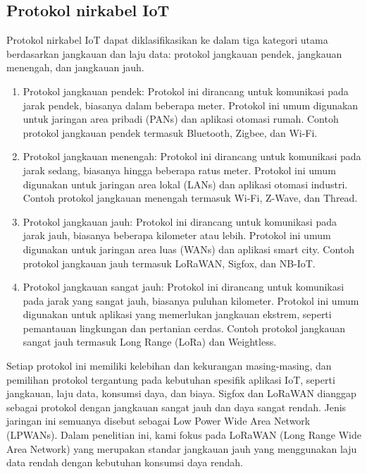 \subsection{Protokol nirkabel IoT}
Protokol nirkabel IoT dapat diklasifikasikan ke dalam tiga kategori utama berdasarkan jangkauan dan laju data: protokol jangkauan pendek, jangkauan menengah, dan jangkauan jauh.
\begin{enumerate}
    \item Protokol jangkauan pendek: Protokol ini dirancang untuk komunikasi pada jarak pendek, biasanya dalam beberapa meter. Protokol ini umum digunakan untuk jaringan area pribadi (PANs) dan aplikasi otomasi rumah. Contoh protokol jangkauan pendek termasuk Bluetooth, Zigbee, dan Wi-Fi.
    \item   Protokol jangkauan menengah: Protokol ini dirancang untuk komunikasi pada jarak sedang, biasanya hingga beberapa ratus meter. Protokol ini umum digunakan untuk jaringan area lokal (LANs) dan aplikasi otomasi industri. Contoh protokol jangkauan menengah termasuk Wi-Fi, Z-Wave, dan Thread.
    \item Protokol jangkauan jauh: Protokol ini dirancang untuk komunikasi pada jarak jauh, biasanya beberapa kilometer atau lebih. Protokol ini umum digunakan untuk jaringan area luas (WANs) dan aplikasi smart city. Contoh protokol jangkauan jauh termasuk LoRaWAN, Sigfox, dan NB-IoT.
    \item Protokol jangkauan sangat jauh: Protokol ini dirancang untuk komunikasi pada jarak yang sangat jauh, biasanya puluhan kilometer. Protokol ini umum digunakan untuk aplikasi yang memerlukan jangkauan ekstrem, seperti pemantauan lingkungan dan pertanian cerdas. Contoh protokol jangkauan sangat jauh termasuk Long Range (LoRa) dan Weightless.
\end{enumerate}


Setiap protokol ini memiliki kelebihan dan kekurangan masing-masing, dan pemilihan protokol tergantung pada kebutuhan spesifik aplikasi IoT, seperti jangkauan, laju data, konsumsi daya, dan biaya.
Sigfox dan LoRaWAN dianggap sebagai protokol dengan jangkauan sangat jauh dan daya sangat rendah. Jenis jaringan ini semuanya disebut sebagai Low Power Wide Area Network (LPWANs). Dalam penelitian ini, kami fokus pada LoRaWAN (Long Range Wide Area Network) yang merupakan standar jangkauan jauh yang menggunakan laju data rendah dengan kebutuhan konsumsi daya rendah.
